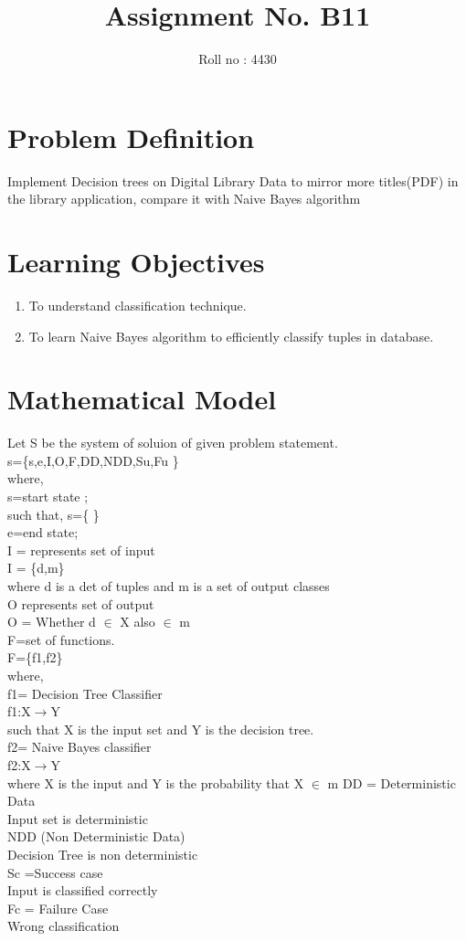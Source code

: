 \documentclass[12pt]{article}
\title{Assignment No. B11}
\author{Roll no : 4430}
\date{}
\begin{document}
  \maketitle
  
\section{Problem Definition}
Implement Decision trees on Digital Library Data to mirror more titles(PDF) in the library application, compare it with Naive Bayes algorithm

\section{Learning Objectives}

\begin{enumerate}
\item To understand classification technique.
\item To learn Naive Bayes algorithm to efficiently classify tuples in database.
\end{enumerate}



\section{Mathematical Model}
Let S be the system of soluion of given problem statement.\\
s=\{s,e,I,O,F,DD,NDD,Su,Fu \}\\
where,\\
s=start state ;\\
such that, s=\{ \}\\
e=end state;\\
I =  represents set of input\\
I = \{d,m\}\\
where d is a det of tuples and m is a set of output classes\\
O represents set of output\\
O = Whether d $\in$ X also $\in$ m\\
F=set of functions.\\
F=\{f1,f2\}\\
where,\\
f1= Decision Tree Classifier\\
f1:X$\rightarrow$Y\\
such that X is the input set and Y is the decision tree.\\
f2= Naive Bayes classifier\\
f2:X$\rightarrow$Y\\
where X is the input and Y is the probability that X $\in$ m
DD = Deterministic Data\\
Input set is deterministic\\
NDD (Non Deterministic Data)\\
Decision Tree is non deterministic\\
Sc =Success case\\Input is classified correctly\\
Fc = Failure Case\\Wrong classification\\
\end{document}

